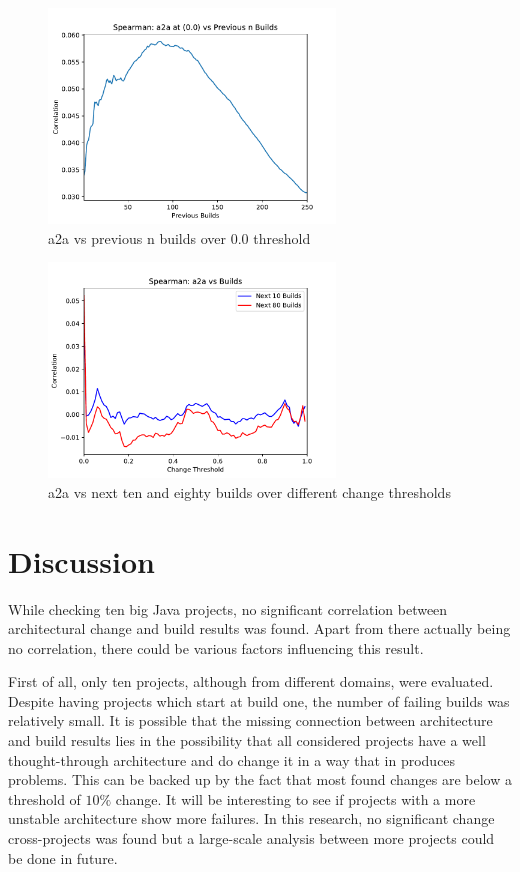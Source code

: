 \documentclass[sigplan, anonymous, review]{acmart}
\begin{document}
\begin{figure}[!t]
	\centering
	\includegraphics[width=3in]{assets/PrevN}
	\caption{a2a vs previous n builds over 0.0 threshold }
	\label{a2aPrevN}
\end{figure}

\begin{figure}[!t]
	\centering
	\includegraphics[width=3in]{assets/a2aCorr}
	\caption{a2a vs next ten and eighty builds over different change thresholds }
	\label{a2aPlot}
\end{figure}


\section{Discussion}


While checking ten big Java projects, no significant correlation between architectural change and build results was found. Apart from there actually being no correlation, there could be various factors influencing this result. 

First of all, only ten projects, although from different domains, were evaluated. Despite having projects which start at build one, the number of failing builds was relatively small. It is possible that the missing connection between architecture and build results lies in the possibility that all considered projects have a well thought-through architecture and do change it in a way that in produces problems. This can be backed up by the fact that most found changes are below a threshold of $10\%$ change. It will be interesting to see if projects with a more unstable architecture show more failures. In this research, no significant change cross-projects was found but a large-scale analysis between more projects could be done in future. 
\end{document}
